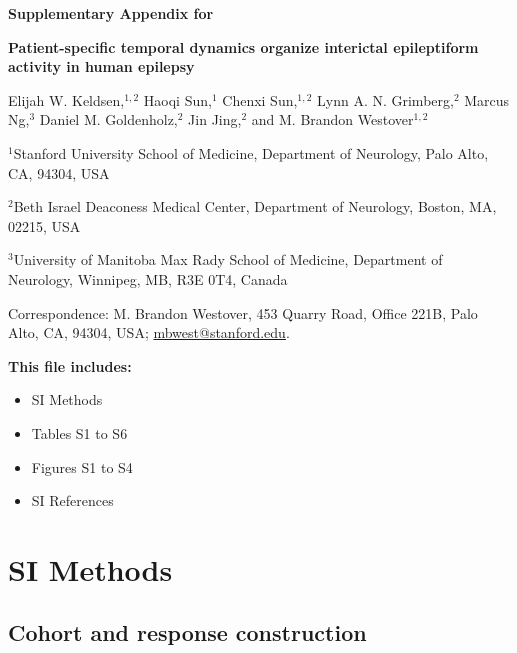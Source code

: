 \documentclass[11pt]{article}
\begin{document}

\thispagestyle{plain}
\begin{center}
{\Large\bfseries Supplementary Appendix for\par}
\vspace{1em}
{\LARGE\bfseries Patient-specific temporal dynamics organize interictal epileptiform activity in human epilepsy\par}
\vspace{2em}
{\large Elijah W. Keldsen,$^{1,2}$ Haoqi Sun,$^{1}$ Chenxi Sun,$^{1,2}$ Lynn A. N. Grimberg,$^{2}$ Marcus Ng,$^{3}$ Daniel M. Goldenholz,$^{2}$ Jin Jing,$^{2}$ and M. Brandon Westover$^{1,2}$\par}
\vspace{1.5em}
{\normalsize $^{1}$Stanford University School of Medicine, Department of Neurology, Palo Alto, CA, 94304, USA\par}
{\normalsize $^{2}$Beth Israel Deaconess Medical Center, Department of Neurology, Boston, MA, 02215, USA\par}
{\normalsize $^{3}$University of Manitoba Max Rady School of Medicine, Department of Neurology, Winnipeg, MB, R3E 0T4, Canada\par}
\vspace{1.5em}
{\normalsize Correspondence: M. Brandon Westover, 453 Quarry Road, Office 221B, Palo Alto, CA, 94304, USA; \href{mailto:mbwest@stanford.edu}{mbwest@stanford.edu}.\par}
\end{center}

\vfill
\textbf{This file includes:}
\begin{itemize}
  \item SI Methods
  \item Tables S1 to S6
  \item Figures S1 to S4
  \item SI References
\end{itemize}
\clearpage

\section*{SI Methods}

\subsection*{Cohort and response construction}
\end{document}
